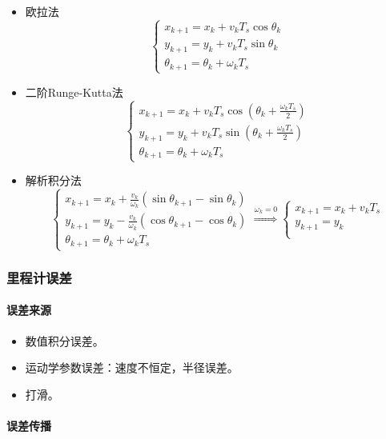 \documentclass[
12pt, %
a4paper, 
oneside, %
headinclude,footinclude, %
]{scrartcl}
\begin{document}
\begin{itemize}
\item 欧拉法
$$
\begin{cases}
x_{k + 1} = x_k + v_k T_s \cos \theta_k \\
y_{k + 1} = y_k + v_k T_s \sin \theta_k \\
\theta_{k + 1} = \theta_k + \omega_k T_s
\end{cases}   
$$
\item 二阶Runge-Kutta法
$$
\begin{cases}
x_{k + 1} = x_k + v_k T_s \cos(\theta_k + \frac{\omega_k T_s}{2}) \\
y_{k + 1} = y_k + v_k T_s \sin(\theta_k + \frac{\omega_k T_s}{2}) \\
\theta_{k + 1} = \theta_k + \omega_k T_s
\end{cases}  
$$
\item 解析积分法
$$
\begin{cases}
x_{k + 1} = x_k + \frac{v_k}{\omega_k} (\sin \theta_{k + 1} - \sin \theta_k) \\
y_{k + 1} = y_k - \frac{v_k}{\omega_k} (\cos \theta_{k + 1} - \cos \theta_k) \\
\theta_{k + 1} = \theta_k + \omega_k T_s
\end{cases} 
\overset{\omega_k = 0}{\Longrightarrow}
\begin{cases}
x_{k + 1} = x_k + v_k T_s \\
y_{k + 1} = y_k \\
\end{cases}  
$$
\end{itemize}
\subsubsection[里程计误差]{里程计误差}
\paragraph{误差来源}
\begin{itemize}
\item 数值积分误差。
\item 运动学参数误差：速度不恒定，半径误差。
\item 打滑。
\end{itemize}
\paragraph{误差传播}\label{sec:error back}~\\
\end{document}
